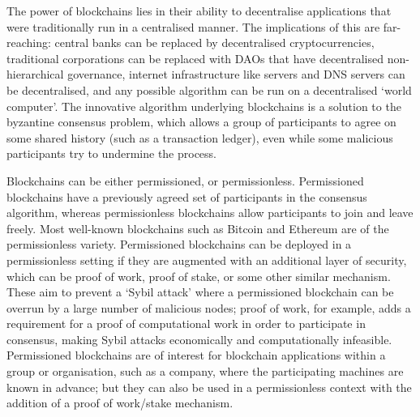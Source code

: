 

The power of blockchains lies in their ability to decentralise applications that were traditionally run in a centralised manner. The implications of this are far-reaching: central banks can be replaced by decentralised cryptocurrencies, traditional corporations can be replaced with DAOs that have decentralised non-hierarchical governance, internet infrastructure like servers and DNS servers can be decentralised, and any possible algorithm can be run on a decentralised `world computer'. The innovative algorithm underlying blockchains is a solution to the byzantine consensus problem, which allows a group of participants to agree on some shared history (such as a transaction ledger), even while some malicious participants try to undermine the process.

Blockchains can be either permissioned, or permissionless. Permissioned blockchains have a previously agreed set of participants in the consensus algorithm, whereas permissionless blockchains allow participants to join and leave freely. Most well-known blockchains such as Bitcoin and Ethereum are of the permissionless variety. Permissioned blockchains can be deployed in a permissionless setting if they are augmented with an additional layer of security, which can be proof of work, proof of stake, or some other similar mechanism. These aim to prevent a `Sybil attack' where a permissioned blockchain can be overrun by a large number of malicious nodes; proof of work, for example, adds a requirement for a proof of computational work in order to participate in consensus, making Sybil attacks economically and computationally infeasible. Permissioned blockchains are of interest for blockchain applications within a group or organisation, such as a company, where the participating machines are known in advance; but they can also be used in a permissionless context with the addition of a proof of work/stake mechanism.


